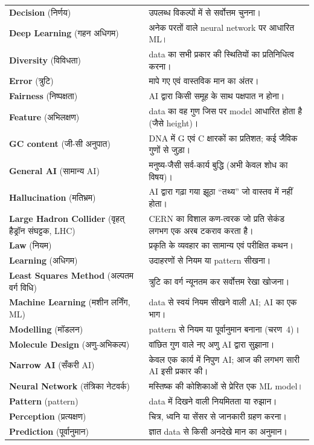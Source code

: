 \begin{longtable}{@{}p{5.2cm} p{8.3cm}@{}}
\textbf{Decision} (निर्णय) & उपलब्ध विकल्पों में से सर्वोत्तम चुनना। \\
\textbf{Deep Learning} (गहन अधिगम) & अनेक परतों वाले neural network पर आधारित ML। \\
\textbf{Diversity} (विविधता) & data का सभी प्रकार की स्थितियों का प्रतिनिधित्व करना। \\
\textbf{Error} (त्रुटि) & मापे गए एवं वास्तविक मान का अंतर। \\
\textbf{Fairness} (निष्पक्षता) & AI द्वारा किसी समूह के साथ पक्षपात न होना। \\
\textbf{Feature} (अभिलक्षण) & data का वह गुण जिस पर model आधारित होता है (जैसे height)। \\
\textbf{GC content} (जी-सी अनुपात) & DNA में G एवं C क्षारकों का प्रतिशत; कई जैविक गुणों से जुड़ा। \\
\textbf{General AI} (सामान्य AI) & मनुष्य-जैसी सर्व-कार्य बुद्धि (अभी केवल शोध का विषय)। \\
\textbf{Hallucination} (मतिभ्रम) & AI द्वारा गढ़ा गया झूठा “तथ्य” जो वास्तव में नहीं होता। \\
\textbf{Large Hadron Collider} (वृहत् हैड्रॉन संघट्टक, LHC) & CERN का विशाल कण-त्वरक जो प्रति सेकंड लगभग एक अरब टकराव करता है। \\
\textbf{Law} (नियम) & प्रकृति के व्यवहार का सामान्य एवं परीक्षित कथन। \\
\textbf{Learning} (अधिगम) & उदाहरणों से नियम या pattern सीखना। \\
\textbf{Least Squares Method} (अल्पतम वर्ग विधि) & त्रुटि का वर्ग न्यूनतम कर सर्वोत्तम रेखा खोजना। \\
\textbf{Machine Learning} (मशीन लर्निंग, ML) & data से स्वयं नियम सीखने वाली AI; AI का एक भाग। \\
\textbf{Modelling} (मॉडलन) & pattern से नियम या पूर्वानुमान बनाना (चरण~4)। \\
\textbf{Molecule Design} (अणु-अभिकल्प) & वांछित गुण वाले नए अणु AI द्वारा सुझाना। \\
\textbf{Narrow AI} (सँकरी AI) & केवल एक कार्य में निपुण AI; आज की लगभग सारी AI इसी प्रकार की। \\
\textbf{Neural Network} (तंत्रिका नेटवर्क) & मस्तिष्क की कोशिकाओं से प्रेरित एक ML model। \\
\textbf{Pattern} (pattern) & data में दिखने वाली नियमितता या रुझान। \\
\textbf{Perception} (प्रत्यक्षण) & चित्र, ध्वनि या सेंसर से जानकारी ग्रहण करना। \\
\textbf{Prediction} (पूर्वानुमान) & ज्ञात data से किसी अनदेखे मान का अनुमान। \\

\end{longtable}

